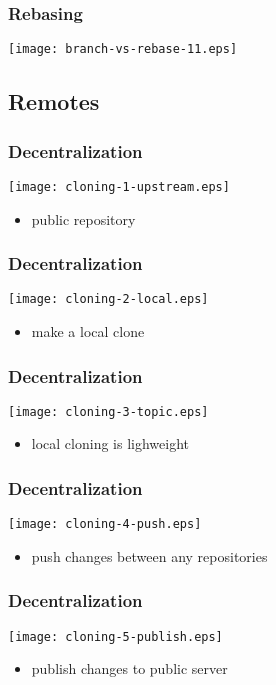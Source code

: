 \documentclass[english]{beamer}
\newcommand{\mysubsection}[2]{%
  \hypertarget{#2}{}%
  \subsection{#1}%
  \label{#2}%
}
\begin{document}
\begin{frame}
\frametitle{Rebasing}

\texttt{[image: branch-vs-rebase-11.eps]}
\vspace{\textheight}
\end{frame}

\mysubsection{Remotes}{using:remotes}

\begin{frame}
\frametitle{Decentralization}
\texttt{[image: cloning-1-upstream.eps]}
\begin{itemize}
        \item public repository
\end{itemize}
\end{frame}

\begin{frame}
\frametitle{Decentralization}
\texttt{[image: cloning-2-local.eps]}
\begin{itemize}
        \item make a local clone
\end{itemize}
\end{frame}

\begin{frame}
\frametitle{Decentralization}
\texttt{[image: cloning-3-topic.eps]}
\begin{itemize}
        \item local cloning is lighweight
\end{itemize}
\end{frame}

\begin{frame}
\frametitle{Decentralization}
\texttt{[image: cloning-4-push.eps]}
\begin{itemize}
        \item push changes between any repositories
\end{itemize}
\end{frame}

\begin{frame}
\frametitle{Decentralization}
\texttt{[image: cloning-5-publish.eps]}
\begin{itemize}
        \item publish changes to public server
\end{itemize}
\end{frame}
\end{document}
